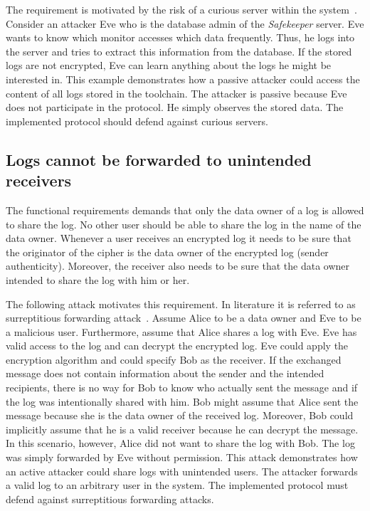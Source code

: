 \documentclass[../main.tex]{subfiles}
\begin{document}
The requirement is motivated by the risk of a curious server within the system~\cite{Nabeel2017}.
Consider an attacker Eve who is the database admin of the \emph{Safekeeper} server.
Eve wants to know which monitor accesses which data frequently.
Thus, he logs into the server and tries to extract this information from the database.
If the stored logs are not encrypted, Eve can learn anything about the logs he might be interested in.
This example demonstrates how a passive attacker could access the content of all logs stored in the toolchain.
The attacker is passive because Eve does not participate in the protocol.
He simply observes the stored data.
The implemented protocol should defend against curious servers.

\subsection{Logs cannot be forwarded to unintended receivers}

The functional requirements demands that only the data owner of a log is allowed to share the log.
No other user should be able to share the log in the name of the data owner.
Whenever a user receives an encrypted log it needs to be sure that the originator of the cipher is the data owner of the encrypted log (sender authenticity).
Moreover, the receiver also needs to be sure that the data owner intended to share the log with him or her.

The following attack motivates this requirement.
In literature it is referred to as surreptitious forwarding attack~\cite{Davis2001}.
Assume Alice to be a data owner and Eve to be a malicious user.
Furthermore, assume that Alice shares a log with Eve.
Eve has valid access to the log and can decrypt the encrypted log.
Eve could apply the encryption algorithm and could specify Bob as the receiver.
If the exchanged message does not contain information about the sender and the intended recipients, there is no way for Bob to know who actually sent the message and if the log was intentionally shared with him.
Bob might assume that Alice sent the message because she is the data owner of the received log.
Moreover, Bob could implicitly assume that he is a valid receiver because he can decrypt the message.
In this scenario, however, Alice did not want to share the log with Bob.
The log was simply forwarded by Eve without permission.
This attack demonstrates how an active attacker could share logs with unintended users.
The attacker forwards a valid log to an arbitrary user in the system.
The implemented protocol must defend against surreptitious forwarding attacks.
\end{document}

